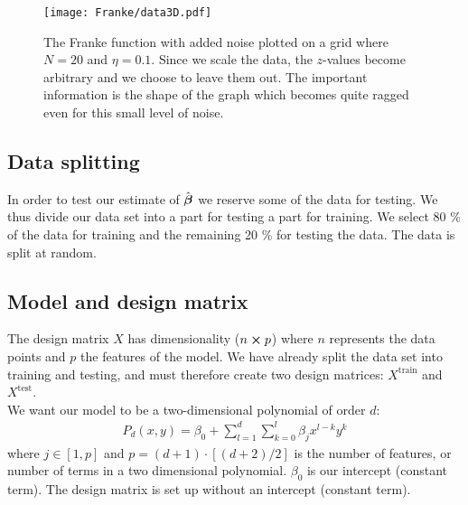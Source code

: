         \begin{figure}
            \texttt{[image: Franke/data3D.pdf]}
            \caption{The Franke function with added noise plotted on a grid where $N=20$ and $\eta=0.1$. Since we scale the data, the $z$-values become arbitrary and we choose to leave them out. The important information is the shape of the graph which becomes quite ragged even for this small level of noise.}
            \label{fig:franke_function_noise}
        \end{figure}

    \subsection{Data splitting}\label{sec:splitting}
        In order to test our estimate of $\hat{\boldsymbol{\beta}}$ we reserve some of the data for testing. We thus divide our data set into a part for testing a part for training. We select 80 \% of the data for training and the remaining 20 \% for testing the data. The data is split at random. 




    \subsection{Model and design matrix}\label{sec:model}
        The design matrix $X$ has dimensionality ($n\cross p$) where $n$ represents the data points and $p$ the features of the model. We have already split the data set into training and testing, and must therefore create two design matrices: $X^{\text{train}}$ and $X^{\text{test}}$. 
        \\
        We want our model to be a two-dimensional polynomial of order $d$:
        \begin{align*}
            P_d(x,y) = \beta_0 + \sum_{l=1}^d\sum_{k=0}^{l} \beta_jx^{l-k}y^k
        \end{align*}
        where $j\in[1,p]$ and $p=(d+1)\cdot\left[(d+2)/2\right]$ is the number of features, or number of terms in a two dimensional polynomial. $\beta_0$ is our intercept (constant term). The design matrix is set up without an intercept (constant term). 





    
